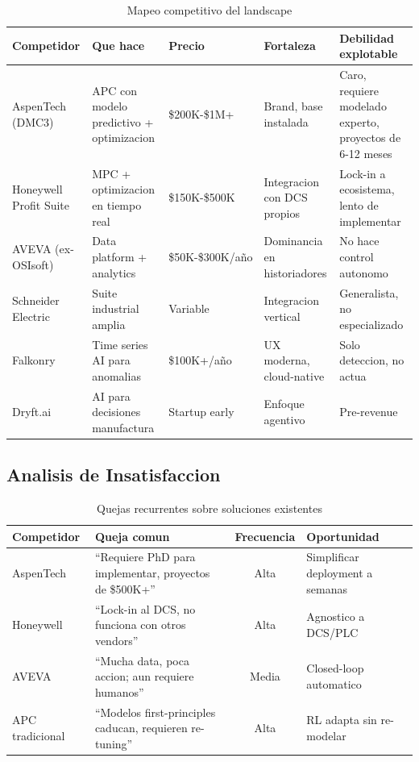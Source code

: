 \documentclass[11pt,a4paper]{article}
\begin{document}
\begin{table}[h]
\centering
\small
\begin{tabular}{p{2.5cm} p{3cm} p{2cm} p{2.5cm} p{3.5cm}}
\toprule
\textbf{Competidor} & \textbf{Que hace} & \textbf{Precio} & \textbf{Fortaleza} & \textbf{Debilidad explotable} \\
\midrule
AspenTech (DMC3) & APC con modelo predictivo + optimizacion & \$200K-\$1M+ & Brand, base instalada & Caro, requiere modelado experto, proyectos de 6-12 meses \\
\addlinespace
Honeywell Profit Suite & MPC + optimizacion en tiempo real & \$150K-\$500K & Integracion con DCS propios & Lock-in a ecosistema, lento de implementar \\
\addlinespace
AVEVA (ex-OSIsoft) & Data platform + analytics & \$50K-\$300K/año & Dominancia en historiadores & No hace control autonomo \\
\addlinespace
Schneider Electric & Suite industrial amplia & Variable & Integracion vertical & Generalista, no especializado \\
\addlinespace
Falkonry & Time series AI para anomalias & \$100K+/año & UX moderna, cloud-native & Solo deteccion, no actua \\
\addlinespace
Dryft.ai & AI para decisiones manufactura & Startup early & Enfoque agentivo & Pre-revenue \\
\bottomrule
\end{tabular}
\caption{Mapeo competitivo del landscape}
\end{table}

\subsection{Analisis de Insatisfaccion}

\begin{table}[h]
\centering
\begin{tabular}{p{2.5cm} p{5cm} c p{4cm}}
\toprule
\textbf{Competidor} & \textbf{Queja comun} & \textbf{Frecuencia} & \textbf{Oportunidad} \\
\midrule
AspenTech & ``Requiere PhD para implementar, proyectos de \$500K+'' & Alta & Simplificar deployment a semanas \\
\addlinespace
Honeywell & ``Lock-in al DCS, no funciona con otros vendors'' & Alta & Agnostico a DCS/PLC \\
\addlinespace
AVEVA & ``Mucha data, poca accion; aun requiere humanos'' & Media & Closed-loop automatico \\
\addlinespace
APC tradicional & ``Modelos first-principles caducan, requieren re-tuning'' & Alta & RL adapta sin re-modelar \\
\bottomrule
\end{tabular}
\caption{Quejas recurrentes sobre soluciones existentes}
\end{table}
\end{document}
